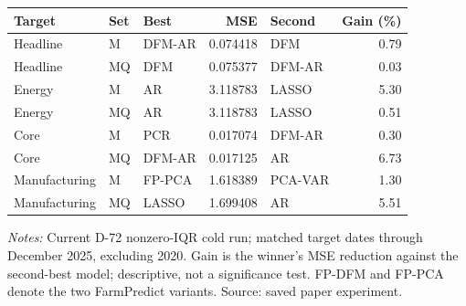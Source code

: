 \begin{threeparttable}
\begin{tabular}{lllrlr}
\toprule
Target & Set & Best & MSE & Second & Gain (\%) \\
\midrule
Headline & M & DFM-AR & 0.074418 & DFM & 0.79 \\
Headline & MQ & DFM & 0.075377 & DFM-AR & 0.03 \\
Energy & M & AR & 3.118783 & LASSO & 5.30 \\
Energy & MQ & AR & 3.118783 & LASSO & 0.51 \\
Core & M & PCR & 0.017074 & DFM-AR & 0.30 \\
Core & MQ & DFM-AR & 0.017125 & AR & 6.73 \\
Manufacturing & M & FP-PCA & 1.618389 & PCA-VAR & 1.30 \\
Manufacturing & MQ & LASSO & 1.699408 & AR & 5.51 \\
\bottomrule
\end{tabular}
\begin{tablenotes}[flushleft]\footnotesize
\item \textit{Notes:} Current D-72 nonzero-IQR cold run; matched target dates through December 2025, excluding 2020. Gain is the winner's MSE reduction against the second-best model; descriptive, not a significance test. FP-DFM and FP-PCA denote the two FarmPredict variants. Source: saved paper experiment.
\end{tablenotes}
\end{threeparttable}
